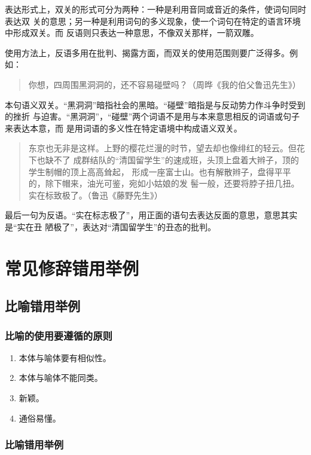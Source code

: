 \documentclass[final,oneside]{ctexbook}
\newenvironment{equotation}{\begin{quotation}\kaishu}{\end{quotation}}
\begin{document}
表达形式上，双关的形式可分为两种：一种是利用音同或音近的条件，使词句同时表达双
关的意思；另一种是利用词句的多义现象，使一个词句在特定的语言环境中形成双关。而
反语则只表达一种意思，不像双关那样，一箭双雕。

使用方法上，反语多用在批判、揭露方面，而双关的使用范围则要广泛得多。例如：

\begin{equotation}
  你想，四周围黑洞洞的，还不容易碰壁吗？（周晔《我的伯父鲁迅先生》）
\end{equotation}
本句语义双关。“黑洞洞”暗指社会的黑暗。“碰壁”暗指是与反动势力作斗争时受到的挫折
与迫害。“黑洞洞”，“碰壁”两个词语不是用与本来意思相反的词语或句子来表达本意，而
是用词语的多义性在特定语境中构成语义双关。

\begin{equotation}
  东京也无非是这样。上野的樱花烂漫的时节，望去却也像绯红的轻云。但花下也缺不了
  成群结队的“清国留学生”的速成班，头顶上盘着大辫子，顶的学生制帽的顶上高高耸起，
  形成一座富士山。也有解散辫子，盘得平平的，除下帽来，油光可鉴，宛如小姑娘的发
  髻一般，还要将脖子扭几扭。实在标致极了。（鲁迅《藤野先生》）
\end{equotation}
最后一句为反语。“实在标志极了”，用正面的语句去表达反面的意思，意思其实是“实在丑
陋极了”，表达对“清国留学生”的丑态的批判。

\section{常见修辞错用举例}

\subsection{比喻错用举例}

\subsubsection{比喻的使用要遵循的原则}

\begin{enumerate}
  \item 本体与喻体要有相似性。

  \item 本体与喻体不能同类。

  \item 新颖。

  \item 通俗易懂。
\end{enumerate}

\subsubsection{比喻错用举例}
\end{document}
